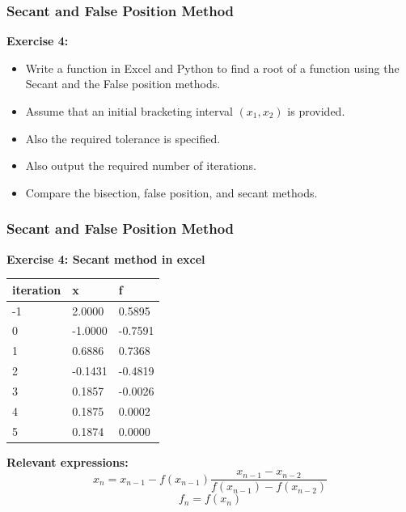 \begin{frame}[fragile]
    \frametitle{Secant and False Position Method}

    \textbf{Exercise 4:}
    \begin{itemize}
        \item Write a function in Excel and Python to find a root of a function using the Secant and the False position methods.
        \item Assume that an initial bracketing interval \((x_1, x_2)\) is provided.
        \item Also the required tolerance is specified.
        \item Also output the required number of iterations.
        \item Compare the bisection, false position, and secant methods.
    \end{itemize}
\end{frame}


\begin{frame}[fragile]
    \frametitle{Secant and False Position Method}

    \textbf{Exercise 4: Secant method in excel}
    
    \begin{table}[]
      \begin{tabular}{|l|l|l|}
      \hline
      iteration & x     & f     \\ \hline
      -1        & 2.0000  & 0.5895  \\ \hline
      0         & -1.0000 & -0.7591 \\ \hline
      1         & 0.6886  & 0.7368  \\ \hline
      2         & -0.1431 & -0.4819 \\ \hline
      3         & 0.1857  & -0.0026 \\ \hline
      4         & 0.1875  & 0.0002  \\ \hline
      5         & 0.1874  & 0.0000  \\ \hline
      \end{tabular}
      \end{table}
    \textbf{Relevant expressions:}
    \[
    x_{n} = x_{n-1} - f(x_{n-1})\frac{x_{n-1} - x_{n-2}}{f(x_{n-1}) - f(x_{n-2})}
    \]
    \[
    f_{n} = f(x_{n})
    \]
\end{frame}

